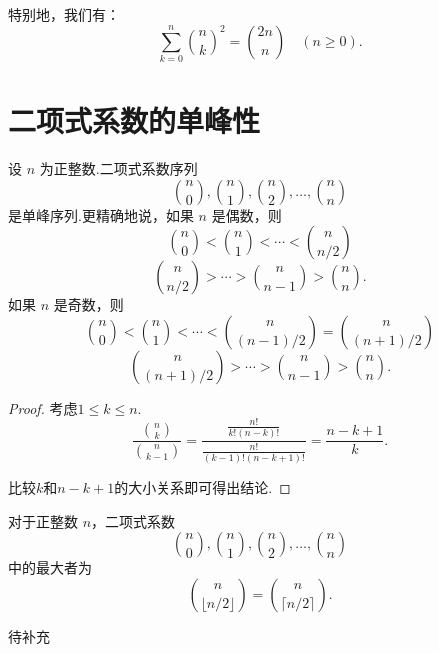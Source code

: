 特别地，我们有：
\[\sum_{k=0}^{n} \binom{n}{k}^2 = \binom{2n}{n} \quad (n \geqslant 0).\]

\section{二项式系数的单峰性}
\begin{theorem}
    设 $n$ 为正整数.二项式系数序列
\[
\binom{n}{0}, \binom{n}{1}, \binom{n}{2}, \ldots, \binom{n}{n}
\]
是单峰序列.更精确地说，如果 $n$ 是偶数，则
\[
\binom{n}{0} < \binom{n}{1} < \cdots < \binom{n}{n/2} \]\[
\binom{n}{n/2} > \cdots > \binom{n}{n-1} > \binom{n}{n}.
\]
如果 $n$ 是奇数，则
\[
\binom{n}{0} < \binom{n}{1} < \cdots < \binom{n}{(n-1)/2} = \binom{n}{(n+1)/2} \]\[
\binom{n}{(n+1)/2} > \cdots > \binom{n}{n-1} > \binom{n}{n}.
\]
\end{theorem}
\begin{proof}
    考虑\(1\leq k\leq n\).
    \[\frac{\binom{n}{k}}{\binom{n}{k-1}} = \frac{\frac{n!}{k!(n-k)!}}{\frac{n!}{(k-1)!(n-k+1)!}} = \frac{n-k+1}{k}.\]

    比较\(k\)和\(n-k+1\)的大小关系即可得出结论.
\end{proof}
\begin{corollary}
    对于正整数 $n$，二项式系数
\[
\binom{n}{0}, \binom{n}{1}, \binom{n}{2}, \ldots, \binom{n}{n}
\]
中的最大者为
\[
\binom{n}{\lfloor n/2 \rfloor} = \binom{n}{\lceil n/2 \rceil}.
\]
\end{corollary}

待补充
